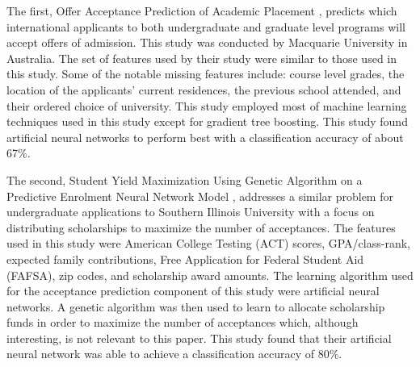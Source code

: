 The first, Offer Acceptance Prediction of Academic Placement \cite{OfferAcceptancePrediction}, predicts which international applicants to both undergraduate and graduate level programs will accept offers of admission. This study was conducted by Macquarie University in Australia. The set of features used by their study were similar to those used in this study. Some of the notable missing features include: course level grades, the location of the applicants' current residences, the previous school attended, and their ordered choice of university. This study employed most of machine learning techniques used in this study except for gradient tree boosting. This study found artificial neural networks to perform best with a classification accuracy of about 67\%.

The second, Student Yield Maximization Using Genetic Algorithm on a Predictive Enrolment Neural Network Model \cite{StudentYieldMaximization}, addresses a similar problem for undergraduate applications to Southern Illinois University with a focus on distributing scholarships to maximize the number of acceptances. The features used in this study were American College Testing (ACT) scores, GPA/class-rank, expected family contributions, Free Application for Federal Student Aid (FAFSA), zip codes, and scholarship award amounts. The learning algorithm used for the acceptance prediction component of this study were artificial neural networks. A genetic algorithm was then used to learn to allocate scholarship funds in order to maximize the number of acceptances which, although interesting, is not relevant to this paper. This study found that their artificial neural network was able to achieve a classification accuracy of 80\%.